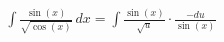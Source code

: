 \documentclass[preview]{standalone}
\begin{document}
\begin{align*}
\int \frac{\sin(x)}{\sqrt{\cos(x)}} \, dx = \int \frac{\sin(x)}{\sqrt{u}} \cdot \frac{-du}{\sin(x)}
\end{align*}
\end{document}
